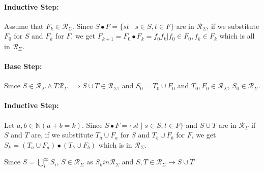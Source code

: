 \documentclass[letterpaper,12pt,addpoints,answers]{exam}
\begin{document}
\begin{questions}
\begin{solutionorlines}[7in]
        \paragraph{Inductive Step:}
        Assume that $F_k \in \mathcal R_\Sigma$.
        Since $S\bullet F=\{st\mid s\in S,t\in F\}$ are in $\mathcal R_\Sigma$,
        if we substitute $F_0$ for $S$ and $F_k$ for $F$,
        we get $F_{k+1} = F_0 \bullet F_k = {f_0f_k | f_0 \in F_0, f_k \in F_k}$
        which is all in $\mathcal R_\Sigma$.

        \paragraph{Base Step:}
        Since $S \in \mathcal R_\Sigma \land T \mathcal R_\Sigma \implies S \cup T \in \mathcal R_\Sigma$,
        and $S_0 = T_0 \cup F_0$ and $T_0, F_0  \in \mathcal R_\Sigma$, $S_0  \in \mathcal R_\Sigma$.

        \paragraph{Inductive Step:}
        Let $a, b \in \mathbb N(a + b = k)$.
        Since $S\bullet F=\{st\mid s\in S,t\in F\}$ and $S\cup T$ are in $\mathcal R_\Sigma$ if $S$ and $T$ are,
        if we substitute $T_a \cup F_a$ for $S$ and $T_b \cup F_b$ for $F$,
        we get $S_k = (T_a \cup F_a) \bullet (T_b \cup F_b)$ which is in $\mathcal R_\Sigma$.
        
        Since $S = \bigcup_i^\infty S_i$, $S \in \mathcal R_\Sigma$ as $S_k in \mathcal R_\Sigma$ and $S,T \in \mathcal R_\Sigma \to S \cup T$
    \end{solutionorlines}
\end{questions}
\end{document}
